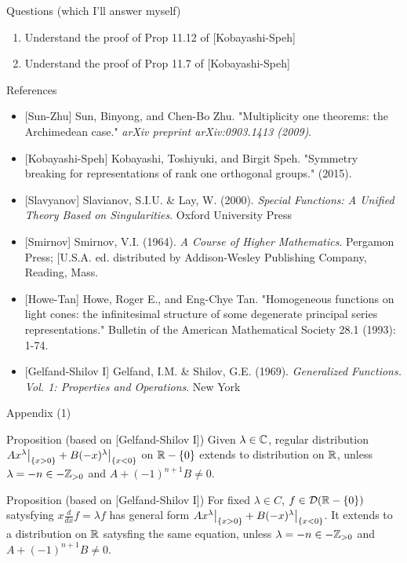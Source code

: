 \documentclass[8pt]{beamer}
\theoremstyle{mystyle}
\begin{document}
\begin{frame}{Questions (which I'll answer myself)}
	\begin{enumerate}
		\item Understand the proof of Prop 11.12 of [Kobayashi-Speh]
		\item Understand the proof of Prop 11.7 of [Kobayashi-Speh]
	\end{enumerate}
\end{frame}
\begin{frame}{References}
	\begin{itemize}
		\item {[Sun-Zhu]} Sun, Binyong, and Chen-Bo Zhu. "Multiplicity one theorems: the Archimedean case." 
			{\it arXiv preprint arXiv:0903.1413 (2009)}.
		\item {[Kobayashi-Speh]} Kobayashi, Toshiyuki, and Birgit Speh. "Symmetry breaking for representations of rank one orthogonal groups." (2015).
		\item {[Slavyanov]} Slavianov, S.I.U. \&
			Lay, W. (2000). {\it Special Functions: A Unified Theory Based on Singularities}. Oxford University Press
		\item {[Smirnov]} Smirnov, V.I. (1964). {\it A Course of Higher Mathematics}.
			Pergamon Press; [U.S.A. ed. distributed by Addison-Wesley Publishing Company, Reading, Mass.
			\item {[Howe-Tan]} Howe, Roger E., and Eng-Chye Tan. "Homogeneous functions on light cones: the infinitesimal structure of some degenerate principal series representations." Bulletin of the American Mathematical Society 28.1 (1993): 1-74.
		\item {[Gelfand-Shilov I]} Gelfand, I.M. \& Shilov, G.E. (1969).
				{\it Generalized Functions. Vol. 1: Properties and Operations}. New York
	\end{itemize}
\end{frame}
\begin{frame}{Appendix (1)}
	\begin{block}{Proposition (based on [Gelfand-Shilov I])}
		Given $\lambda\in\mathbb{C}$, regular distribution $Ax^\lambda\big|_{ \left\{ x>0 \right\} }+B(-x)^\lambda\big|_{ \left\{ x<0 \right\} }$
		on $\mathbb{R}-\left\{ 0 \right\}$
		extends to distribution on $\mathbb{R}$, unless $\lambda=-n\in-\mathbb{Z}_{ >0 }$ and $A+(-1)^{ n+1 }B\neq0$\footnotemark.
	\end{block}
	\begin{block}{Proposition (based on [Gelfand-Shilov I])}
		For fixed $\lambda\in C$, $f\in\mathcal{D}(\mathbb{R}-\left\{ 0 \right\})$ satysfying $x\frac{d}{dx}f=\lambda f$ has
		general form $Ax^\lambda\big|_{ \left\{ x>0 \right\} }+B(-x)^\lambda\big|_{ \left\{ x<0 \right\} }$. It extends
		to a distribution on $\mathbb{R}$ satysfing the same equation, unless $\lambda=-n\in-\mathbb{Z}_{ >0 }$ and $A+(-1)^{ n+1 }B\neq0$.
	\end{block}
\end{frame}
\end{document}
